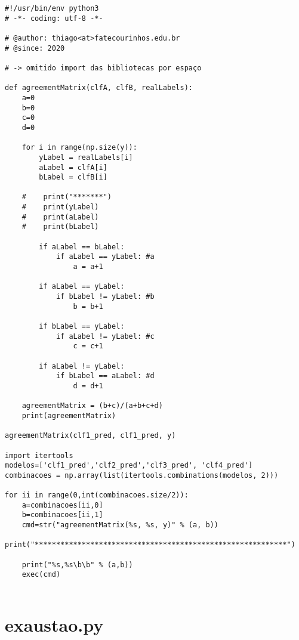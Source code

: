\begin{verbatim}
#!/usr/bin/env python3
# -*- coding: utf-8 -*-

# @author: thiago<at>fatecourinhos.edu.br
# @since: 2020

# -> omitido import das bibliotecas por espaço 
    
def agreementMatrix(clfA, clfB, realLabels):
    a=0
    b=0
    c=0
    d=0

    for i in range(np.size(y)):
        yLabel = realLabels[i]
        aLabel = clfA[i]
        bLabel = clfB[i]

    #    print("*******")
    #    print(yLabel)
    #    print(aLabel)
    #    print(bLabel)

        if aLabel == bLabel:
            if aLabel == yLabel: #a
                a = a+1

        if aLabel == yLabel:
            if bLabel != yLabel: #b
                b = b+1

        if bLabel == yLabel:
            if aLabel != yLabel: #c
                c = c+1

        if aLabel != yLabel:
            if bLabel == aLabel: #d
                d = d+1

    agreementMatrix = (b+c)/(a+b+c+d)
    print(agreementMatrix)

agreementMatrix(clf1_pred, clf1_pred, y)

import itertools
modelos=['clf1_pred','clf2_pred','clf3_pred', 'clf4_pred']
combinacoes = np.array(list(itertools.combinations(modelos, 2)))

for ii in range(0,int(combinacoes.size/2)):
    a=combinacoes[ii,0]
    b=combinacoes[ii,1]
    cmd=str("agreementMatrix(%s, %s, y)" % (a, b))
    print("***********************************************************")

    print("%s,%s\b\b" % (a,b))
    exec(cmd)


\end{verbatim}

\chapter{exaustao.py}



